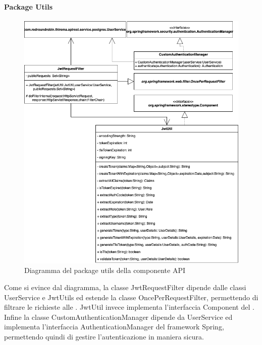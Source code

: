 		\paragraph*{Package Utils}
		\begin{figure}[H]
			\centering
			\includegraphics[scale=0.550]{res/images/API/UtilsPackage.png}
			\caption{Diagramma del package utils della componente API}
			\label{Diagramma 11}
		\end{figure}
		Come si evince dal diagramma, la classe JwtRequestFilter dipende dalle classi UserService e JwtUtils ed estende la classe OncePerRequestFilter, permettendo di filtrare le richieste alle .
		\newline
		JwtUtil invece implementa l'interfaccia Component del .
		\newline
		Infine la classe CustomAuthenticationManager dipende da UserService ed implementa l'interfaccia AuthenticationManager del framework Spring, permettendo quindi di gestire l'autenticazione in maniera sicura.
